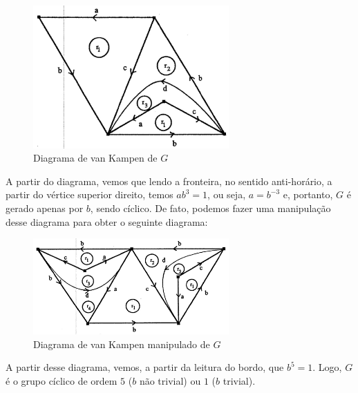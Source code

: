 	\begin{figure}[H]
	\begin{center}
		\includegraphics[width=7.5cm]{Images/diagrama_ciclico.png}
	\end{center}
	\caption{Diagrama de van Kampen de $G$}
	\label{figura diagrama ciclico}
	\end{figure}
    A partir do diagrama, vemos que lendo a fronteira, no sentido anti-horário, a partir do vértice 
    superior direito, temos $ab^3 = 1$, ou seja, $a = b^{-3}$ e, portanto, $G$ é gerado apenas por 
    $b$, sendo cíclico. De fato, podemos fazer uma manipulação desse diagrama para obter o seguinte 
    diagrama:
	\begin{figure}[H]
		\begin{center}
			\includegraphics[width=7.5cm]{Images/diagrama_ciclico_2.png}
		\end{center}
	\caption{Diagrama de van Kampen manipulado de $G$}
	\label{figura diagrama ciclico 2}
	\end{figure}
	A partir desse diagrama, vemos, a partir da leitura do bordo, que $b^5=1$. Logo, $G$ é o 
	grupo cíclico de ordem $5$ ($b$ não trivial) ou $1$ ($b$ trivial).
	
